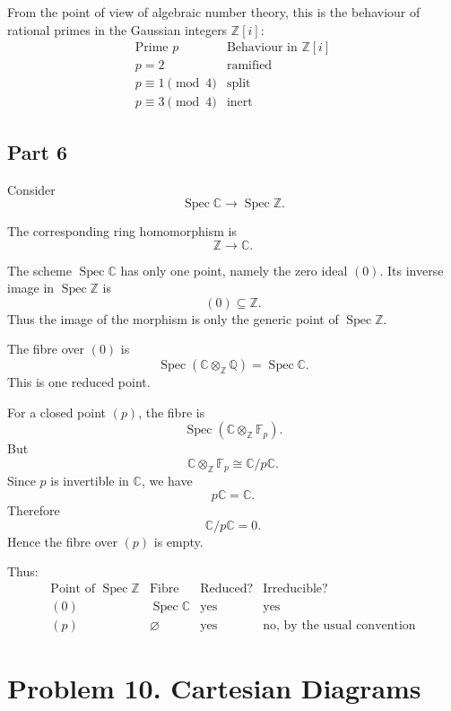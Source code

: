 \documentclass[12pt,a4paper]{article}
\theoremstyle{notespace}
\begin{document}
From the point of view of algebraic number theory, this is the behaviour
of rational primes in the Gaussian integers \(\mathbb{Z}[i]\):
\[
\begin{array}{c|c}
	\text{Prime }p
	&
	\text{Behaviour in }\mathbb{Z}[i]
	\\
	\hline
	p=2
	&
	\text{ramified}
	\\
	p\equiv 1\pmod 4
	&
	\text{split}
	\\
	p\equiv 3\pmod 4
	&
	\text{inert}
\end{array}
\]

\subsection{Part 6}

Consider
\[
\operatorname{Spec}\mathbb{C}
\longrightarrow
\operatorname{Spec}\mathbb{Z}.
\]

The corresponding ring homomorphism is
\[
\mathbb{Z}\longrightarrow \mathbb{C}.
\]

The scheme \(\operatorname{Spec}\mathbb{C}\) has only one point, namely
the zero ideal \((0)\). Its inverse image in \(\operatorname{Spec}\mathbb{Z}\)
is
\[
(0)\subseteq \mathbb{Z}.
\]
Thus the image of the morphism is only the generic point of
\(\operatorname{Spec}\mathbb{Z}\).

The fibre over \((0)\) is
\[
\operatorname{Spec}
\left(
\mathbb{C}\otimes_{\mathbb{Z}}\mathbb{Q}
\right)
=
\operatorname{Spec}\mathbb{C}.
\]
This is one reduced point.

For a closed point \((p)\), the fibre is
\[
\operatorname{Spec}
\left(
\mathbb{C}\otimes_{\mathbb{Z}}\mathbb{F}_p
\right).
\]
But
\[
\mathbb{C}\otimes_{\mathbb{Z}}\mathbb{F}_p
\cong
\mathbb{C}/p\mathbb{C}.
\]
Since \(p\) is invertible in \(\mathbb{C}\), we have
\[
p\mathbb{C}=\mathbb{C}.
\]
Therefore
\[
\mathbb{C}/p\mathbb{C}=0.
\]
Hence the fibre over \((p)\) is empty.

Thus:
\[
\begin{array}{c|c|c|c}
	\text{Point of }\operatorname{Spec}\mathbb{Z}
	&
	\text{Fibre}
	&
	\text{Reduced?}
	&
	\text{Irreducible?}
	\\
	\hline
	(0)
	&
	\operatorname{Spec}\mathbb{C}
	&
	\text{yes}
	&
	\text{yes}
	\\
	(p)
	&
	\varnothing
	&
	\text{yes}
	&
	\text{no, by the usual convention}
\end{array}
\]

\section{Problem 10. Cartesian Diagrams}
\end{document}
